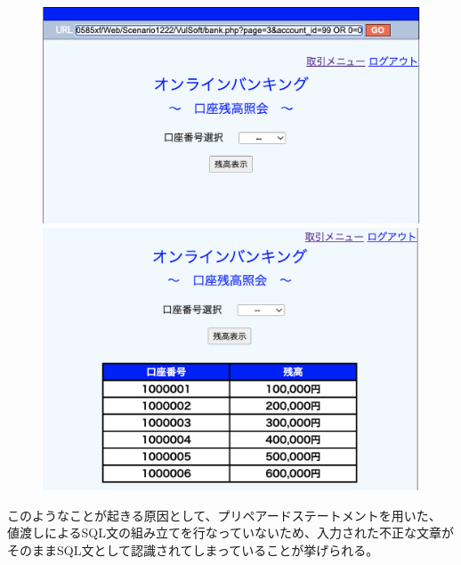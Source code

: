 \documentclass[dvipdfmx,autodetect-engine,titlepage]{jsarticle}
\begin{document}
\begin{figure}[h]
  \centering
  \begin{minipage}[b]{0.45\linewidth}
  \begin{center}
    \includegraphics[keepaspectratio,scale=0.35]{pic16.png}
    \end{center}
    \caption{}
  \end{minipage}
  \begin{minipage}[b]{0.45\linewidth}
  \begin{center}
    \includegraphics[keepaspectratio,scale=0.35]{pic17.png}
    \end{center}
    \caption{}
  \end{minipage}
\end{figure}

このようなことが起きる原因として、プリペアードステートメントを用いた、
値渡しによるSQL文の組み立てを行なっていないため、入力された不正な文章が
そのままSQL文として認識されてしまっていることが挙げられる。
\end{document}
